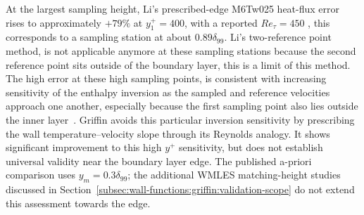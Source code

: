 At the largest sampling height, Li's prescribed-edge M6Tw025 heat-flux error rises to approximately \(+79\%\) at \(y_1^+=400\), with a reported \(Re_\tau = 450\) \cite{zhang2018direct}, this corresponds to a sampling station at about \(0.89\delta_{99}\). Li's two-reference point method, is not applicable anymore at these sampling stations because the second reference point sits outside of the boundary layer, this is a limit of this method. The high error at these high sampling points, is consistent with increasing sensitivity of the enthalpy inversion as the sampled and reference velocities approach one another, especially because the first sampling point also lies outside the inner layer~\cite[Eq.~(40)]{li2025WF}. Griffin avoids this particular inversion sensitivity by prescribing the wall temperature--velocity slope through its Reynolds analogy. It shows significant improvement to this high \(y^+\) sensitivity, but does not establish universal validity near the boundary layer edge. The published a-priori comparison uses \(y_m=0.3\delta_{99}\); the additional WMLES matching-height studies discussed in Section~\ref{subsec:wall-functions:griffin:validation-scope} do not extend this assessment towards the edge.

\clearpage

